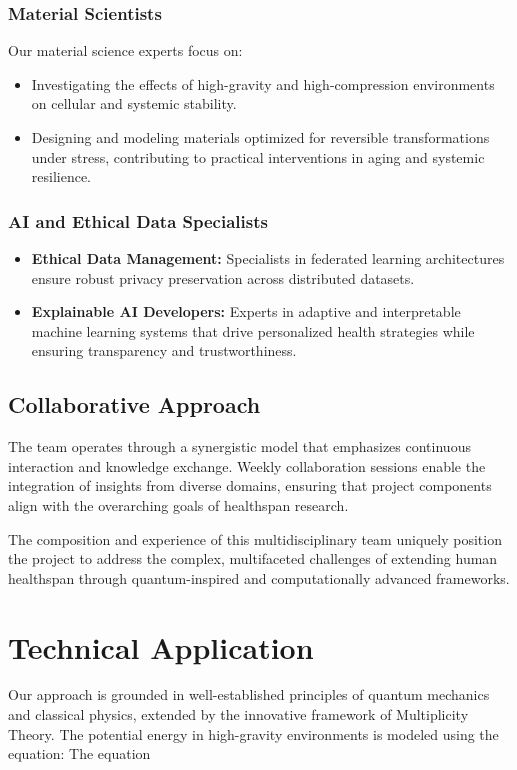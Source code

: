 \documentclass{article}
\theoremstyle{plain}
\begin{document}
\subsubsection*{Material Scientists}
Our material science experts focus on:
\begin{itemize}
    \item Investigating the effects of high-gravity and high-compression environments on cellular and systemic stability.
    \item Designing and modeling materials optimized for reversible transformations under stress, contributing to practical interventions in aging and systemic resilience.
\end{itemize}

\subsubsection*{AI and Ethical Data Specialists}
\begin{itemize}
    \item \textbf{Ethical Data Management:} Specialists in federated learning architectures ensure robust privacy preservation across distributed datasets.
    \item \textbf{Explainable AI Developers:} Experts in adaptive and interpretable machine learning systems that drive personalized health strategies while ensuring transparency and trustworthiness.
\end{itemize}

\subsection*{Collaborative Approach}
The team operates through a synergistic model that emphasizes continuous interaction and knowledge exchange. Weekly collaboration sessions enable the integration of insights from diverse domains, ensuring that project components align with the overarching goals of healthspan research. 

The composition and experience of this multidisciplinary team uniquely position the project to address the complex, multifaceted challenges of extending human healthspan through quantum-inspired and computationally advanced frameworks.
\section{Technical Application}

Our approach is grounded in well-established principles of quantum mechanics and classical physics, extended by the innovative framework of Multiplicity Theory. The potential energy in high-gravity environments is modeled using the equation:
The equation 
\end{document}
